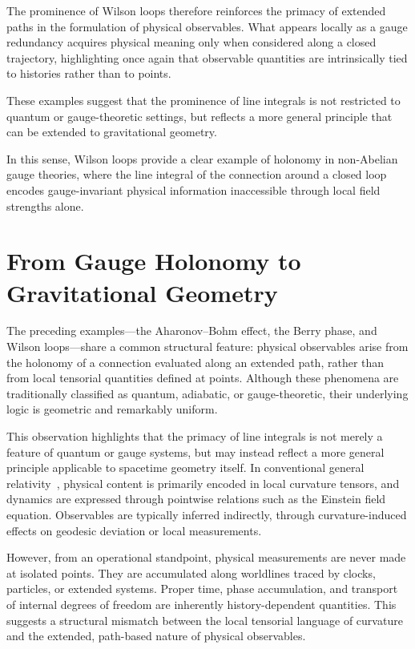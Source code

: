 \documentclass[%
 reprint,
 amsmath,amssymb,
 aps,
 prb,
]{revtex4-2}
\numberwithin{equation}{section}
\begin{document}
The prominence of Wilson loops therefore reinforces the primacy of extended paths in the formulation of physical observables. What appears locally as a gauge redundancy acquires physical meaning only when considered along a closed trajectory, highlighting once again that observable quantities are intrinsically tied to histories rather than to points.

These examples suggest that the prominence of line integrals is not restricted to quantum or gauge-theoretic settings, but reflects a more general principle that can be extended to gravitational geometry.

In this sense, Wilson loops provide a clear example of holonomy in non-Abelian gauge theories, where the line integral of the connection around a closed loop encodes gauge-invariant physical information inaccessible through local field strengths alone.


\section{From Gauge Holonomy to Gravitational Geometry}
\label{sec:gauge_to_gravity}

The preceding examples---the Aharonov--Bohm effect, the Berry phase, and Wilson loops---share a common structural feature: physical observables arise from the holonomy of a connection evaluated along an extended path, rather than from local tensorial quantities defined at points. Although these phenomena are traditionally classified as quantum, adiabatic, or gauge-theoretic, their underlying logic is geometric and remarkably uniform.

This observation highlights that the primacy of line integrals is not merely a feature of quantum or gauge systems, but may instead reflect a more general principle applicable to spacetime geometry itself. In conventional general relativity~\cite{Wald}, physical content is primarily encoded in local curvature tensors, and dynamics are expressed through pointwise relations such as the Einstein field equation. Observables are typically inferred indirectly, through curvature-induced effects on geodesic deviation or local measurements.

However, from an operational standpoint, physical measurements are never made at isolated points. They are accumulated along worldlines traced by clocks, particles, or extended systems. Proper time, phase accumulation, and transport of internal degrees of freedom are inherently history-dependent quantities. This suggests a structural mismatch between the local tensorial language of curvature and the extended, path-based nature of physical observables.
\end{document}
